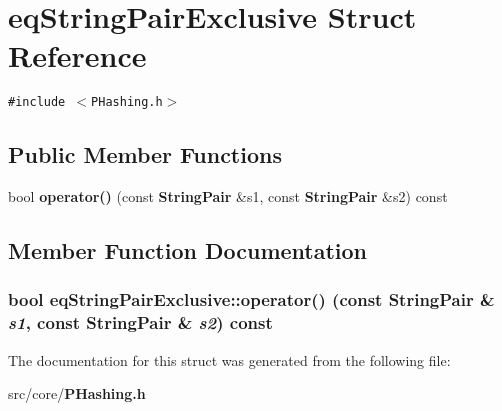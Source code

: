 \section{eq\-String\-Pair\-Exclusive Struct Reference}
\label{structeqStringPairExclusive}
{\tt \#include $<$PHashing.h$>$}

\subsection*{Public Member Functions}
\begin{CompactItemize}
\item 
bool {\bf operator()} (const {\bf String\-Pair} \&s1, const {\bf String\-Pair} \&s2) const
\end{CompactItemize}


\subsection{Member Function Documentation}
\subsubsection{\setlength{\rightskip}{0pt plus 5cm}bool eq\-String\-Pair\-Exclusive::operator() (const {\bf String\-Pair} \& {\em s1}, const {\bf String\-Pair} \& {\em s2}) const\hspace{0.3cm}{\tt  [inline]}}\label{structeqStringPairExclusive_cf17364dd0ee5a3c050fbab909cdecdb}




The documentation for this struct was generated from the following file:\begin{CompactItemize}
\item 
src/core/{\bf PHashing.h}\end{CompactItemize}

